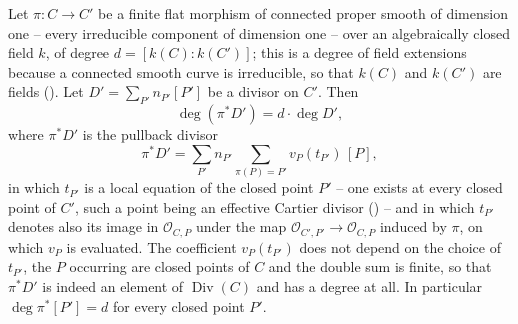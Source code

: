 \begin{lemma}
\label{lem:pcb-pullback-degree}
Let \(\pi:C\to C'\) be a finite flat morphism of connected proper
smooth  of dimension one -- every
irreducible component of dimension one -- over an algebraically closed
field \(k\), of degree \(d=[k(C):k(C')]\); this is a degree of field
extensions because a connected smooth curve is irreducible, so that
\(k(C)\) and \(k(C')\) are fields
().  Let
\(D'=\sum_{P'}n_{P'}[P']\) be a divisor on \(C'\).  Then
\[
 \deg(\pi^*D')=d\cdot\deg D',
\]
where \(\pi^*D'\) is the pullback divisor
\[
 \pi^*D'=\sum_{P'}n_{P'}\sum_{\pi(P)=P'}v_P(t_{P'})\,[P],
\]
in which \(t_{P'}\) is a local equation of the closed point \(P'\) --
one exists at every closed point of \(C'\), such a point being an
effective Cartier divisor () -- and in
which \(t_{P'}\) denotes also its image in \(\mathcal O_{C,P}\) under
the map \(\mathcal O_{C',P'}\to\mathcal O_{C,P}\) induced by \(\pi\),
on which \(v_P\) is evaluated.  The coefficient \(v_P(t_{P'})\) does
not depend on the choice of \(t_{P'}\), the \(P\) occurring are closed
points of \(C\) and the double sum is finite, so that \(\pi^*D'\) is
indeed an element of \(\operatorname{Div}(C)\) and has a degree at all.
In particular \(\deg\pi^*[P']=d\) for every closed point \(P'\).
\end{lemma}
